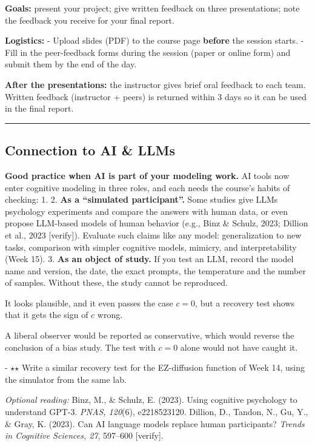 \textbf{Goals:} present your project; give written feedback on three
presentations; note the feedback you receive for your final report.

\textbf{Logistics:} - Upload slides (PDF) to the course page
\textbf{before} the session starts. - Fill in the peer-feedback forms
during the session (paper or online form) and submit them by the end of
the day.

\textbf{After the presentations:} the instructor gives brief oral
feedback to each team. Written feedback (instructor + peers) is returned
within 3 days so it can be used in the final report.

\begin{center}\rule{0.5\linewidth}{0.5pt}\end{center}

\subsection{Connection to AI \& LLMs}

\textbf{Good practice when AI is part of your modeling work.} AI tools
now enter cognitive modeling in three roles, and each needs the course's
habits of checking: 1. 2. \textbf{As a ``simulated participant''.} Some
studies give LLMs psychology experiments and compare the answers with
human data, or even propose LLM-based models of human behavior (e.g.,
Binz \& Schulz, 2023; Dillion et al., 2023 {[}verify{]}). Evaluate such
claims like any model: generalization to new tasks, comparison with
simpler cognitive models, mimicry, and interpretability (Week 15). 3.
\textbf{As an object of study.} If you test an LLM, record the model
name and version, the date, the exact prompts, the temperature and the
number of samples. Without these, the study cannot be reproduced.

It looks plausible, and it even passes the case \(c = 0\), but a
recovery test shows that it gets the sign of \(c\) wrong.

A liberal observer would be reported as conservative, which would
reverse the conclusion of a bias study. The test with \(c = 0\) alone
would not have caught it.

- \ensuremath{\star}\ensuremath{\star} Write a similar recovery test for the EZ-diffusion function of Week
14, using the simulator from the same lab.

\emph{Optional reading:} Binz, M., \& Schulz, E. (2023). Using cognitive
psychology to understand GPT-3. \emph{PNAS, 120}(6), e2218523120.
Dillion, D., Tandon, N., Gu, Y., \& Gray, K. (2023). Can AI language
models replace human participants? \emph{Trends in Cognitive Sciences,
27}, 597--600 {[}verify{]}.

